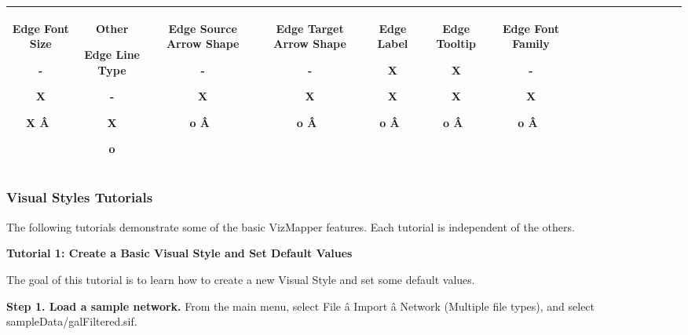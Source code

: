 \begin{tabular}{|c|c|c|c|c|c|c|c|c|c|c|c|c|c|c|c|c|}
 Edge Font Size 


 - 


 X 


 X 
\^A  &

 Other 


  Edge Line Type 


  - 


 X 


 o 
 &

  Edge Source Arrow Shape 


  - 


  X 


  o 
\^A  &

  Edge Target Arrow Shape 


  - 


 X 


 o 
\^A  &

  Edge Label 


  X 


  X 


 o 
\^A  &

  Edge Tooltip 


  X 


  X 


 o 
\^A  &

  Edge Font Family 


  - 


 X 


 o 
\^A  \\
 \hline 

\end{tabular}



 
\subsubsection*{Visual Styles Tutorials}


 The following tutorials demonstrate some of the basic VizMapper features. Each tutorial is independent of the others. 


 \textbf{Tutorial 1: Create a Basic Visual Style and Set Default Values}


 The goal of this tutorial is to learn how to create a new Visual Style and set some default values. 


 \textbf{Step 1. Load a sample network.}
 From the main menu, select File \^a Import \^a Network (Multiple file types), and select sampleData/galFiltered.sif. 


